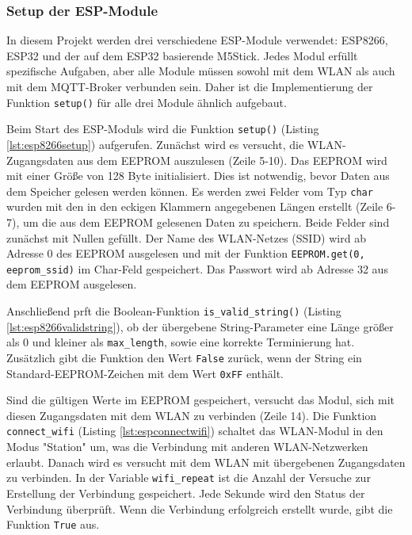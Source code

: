 \documentclass[12pt, letterpaper]{article}
\begin{document}
  \subsubsection{Setup der ESP-Module}
  \par In diesem Projekt werden drei verschiedene ESP-Module verwendet: ESP8266, ESP32 und der auf dem ESP32 basierende M5Stick.  Jedes Modul erfüllt spezifische Aufgaben, aber alle Module müssen sowohl mit dem WLAN als auch mit dem MQTT-Broker verbunden sein. Daher ist die Implementierung der Funktion \texttt{setup()} für alle drei Module ähnlich aufgebaut.
  \par Beim Start des ESP-Moduls wird die Funktion \texttt{setup()} (Listing \ref{lst:esp8266setup}) aufgerufen. Zunächst wird es versucht, die WLAN-Zugangsdaten aus dem EEPROM auszulesen (Zeile 5-10). Das EEPROM wird mit einer Größe von 128 Byte initialisiert. Dies ist notwendig, bevor Daten aus dem Speicher gelesen werden können. Es werden zwei Felder vom Typ \texttt{char} wurden mit den in den eckigen Klammern angegebenen Längen erstellt (Zeile 6-7), um die aus dem EEPROM gelesenen Daten zu speichern. Beide Felder sind zunächst mit Nullen gefüllt. Der Name des WLAN-Netzes (SSID) wird ab Adresse 0 des EEPROM ausgelesen und mit der Funktion \texttt{EEPROM.get(0, eeprom\_ssid)} im Char-Feld gespeichert. Das Passwort wird ab Adresse 32 aus dem EEPROM ausgelesen.
  \par Anschließend prft die Boolean-Funktion \texttt{is\_valid\_string()} (Listing \ref{lst:esp8266validstring}), ob der übergebene String-Parameter eine Länge größer als 0 und kleiner als \texttt{max\_length}, sowie eine korrekte Terminierung hat. Zusätzlich gibt die Funktion den Wert \texttt{False} zurück, wenn der String ein Standard-EEPROM-Zeichen mit dem Wert \texttt{0xFF} enthält.
  \par Sind die gültigen Werte im EEPROM gespeichert, versucht das Modul, sich mit diesen Zugangsdaten mit dem WLAN zu verbinden (Zeile 14). Die Funktion \texttt{connect\_wifi} (Listing \ref{lst:espconnectwifi}) schaltet das WLAN-Modul in den Modus "Station" um, was die Verbindung mit anderen WLAN-Netzwerken erlaubt. Danach wird es versucht mit dem WLAN mit übergebenen Zugangsdaten zu verbinden. In der Variable \texttt{wifi\_repeat} ist die Anzahl der Versuche zur Erstellung der Verbindung gespeichert. Jede Sekunde wird den Status der Verbindung überprüft. Wenn die Verbindung erfolgreich erstellt wurde, gibt die Funktion \texttt{True} aus. 
\end{document}

